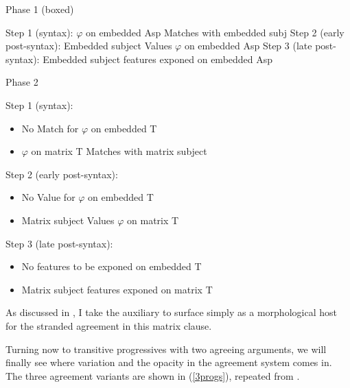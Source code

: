 \documentclass[output=paper
,modfonts
,nonflat]{langsci/langscibook}
\begin{document}
\eal \label{layout3}
\ex Phase 1 (boxed)
\begin{xlist}
\ex Step 1 (syntax): $\varphi$ on embedded Asp Matches with embedded subj
\ex Step 2 (early post-syntax): Embedded subject Values $\varphi$ on embedded Asp
\ex Step 3 (late post-syntax): Embedded subject features exponed on embedded Asp
\end{xlist}
\ex Phase 2
\begin{xlist}
\ex Step 1 (syntax): \begin{itemize}
                    \item No Match for $\varphi$ on embedded T
                    \item $\varphi$ on matrix T Matches with matrix subject
                    \end{itemize}
\ex Step 2 (early post-syntax): \begin{itemize}
                    \item No Value for $\varphi$ on embedded T
                    \item Matrix subject Values $\varphi$ on matrix T
                    \end{itemize}
\ex Step 3 (late post-syntax): \begin{itemize}
                    \item No features to be exponed on embedded T
                    \item Matrix subject features exponed on matrix T
                    \end{itemize}
\end{xlist}
\zl

\noindent As discussed in , I take the auxiliary to surface simply as a morphological host for the stranded agreement in this matrix clause. 

Turning now to transitive progressives with two agreeing arguments, we will finally see where variation and the opacity in the agreement system comes in. The three agreement variants are shown in (\ref{3progs}), repeated from . 
\end{document}
